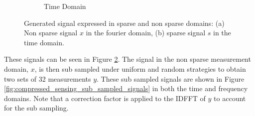 \documentclass[11pt]{article}
\begin{document}
\begin{figure} [H]
\begin{subfigure}{.45\textwidth}
        \caption{Time Domain}
        \label{fig:sparse_signal}
    \end{subfigure}%

    \caption{Generated signal expressed in sparse and non sparse domains: (a) Non sparse signal \( x\) in the fourier domain, (b) sparse signal \( s \) in the time domain.}
    \label{fig:compressed_sensing_signal}
\end{figure}

These signals can be seen in Figure \ref{fig:compressed_sensing_signal}. The signal in the non sparse measurement domain, \(x\), is then sub sampled under uniform and random strategies to obtain two sets of 32 measurements \( y \). These sub sampled signals are shown in Figure \ref{fig:compressed_sensing_sub_sampled_signals} in both the time and frequency domains. Note that a correction factor is applied to the IDFFT of \(y\) to account for the sub sampling.
\end{document}
